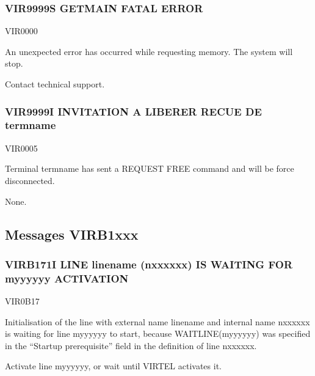 \documentclass[letterpaper,10pt,english]{sphinxmanual}
\begin{document}
\subsubsection{VIR9999S GETMAIN FATAL ERROR}
\label{\detokenize{messages:vir9999s-getmain-fatal-error}}\begin{description}
\sphinxAtStartPar
VIR0000

\sphinxAtStartPar
An unexpected error has occurred while requesting memory. The system will stop.

\sphinxAtStartPar
Contact technical support.

\end{description}


\subsubsection{VIR9999I INVITATION A LIBERER RECUE DE termname}
\label{\detokenize{messages:vir9999i-invitation-a-liberer-recue-de-termname}}\begin{description}
\sphinxAtStartPar
VIR0005

\sphinxAtStartPar
Terminal termname has sent a REQUEST FREE command and will be force disconnected.

\sphinxAtStartPar
None.

\end{description}


\subsection{Messages VIRB1xxx}
\label{\detokenize{messages:messages-virb1xxx}}

\subsubsection{VIRB171I LINE linename (n\sphinxhyphen{}xxxxxx) IS WAITING FOR m\sphinxhyphen{}yyyyyy ACTIVATION}
\label{\detokenize{messages:virb171i-line-linename-n-xxxxxx-is-waiting-for-m-yyyyyy-activation}}\begin{description}
\sphinxAtStartPar
VIR0B17

\sphinxAtStartPar
Initialisation of the line with external name linename and internal name n\sphinxhyphen{}xxxxxx is waiting for line m\sphinxhyphen{}yyyyyy to start, because WAIT\sphinxhyphen{}LINE(m\sphinxhyphen{}yyyyyy) was specified in the “Startup prerequisite” field in the definition of line n\sphinxhyphen{}xxxxxx.

\sphinxAtStartPar
Activate line m\sphinxhyphen{}yyyyyy, or wait until VIRTEL activates it.

\end{description}
\end{document}
